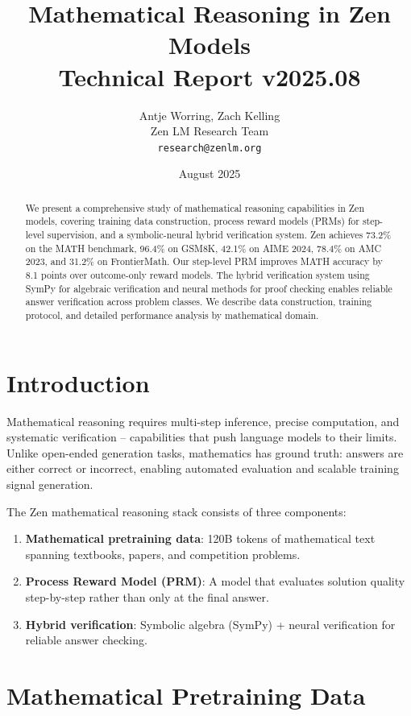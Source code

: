 \documentclass[11pt,a4paper]{article}
\title{\textbf{Mathematical Reasoning in Zen Models}\\
\large Technical Report v2025.08}
\author{Antje Worring, Zach Kelling \\ Zen LM Research Team\\
\texttt{research@zenlm.org}}
\date{August 2025}
\begin{document}
\maketitle

\begin{abstract}
We present a comprehensive study of mathematical reasoning capabilities in Zen models,
covering training data construction, process reward models (PRMs) for step-level
supervision, and a symbolic-neural hybrid verification system. Zen achieves 73.2\%
on the MATH benchmark, 96.4\% on GSM8K, 42.1\% on AIME 2024, 78.4\% on AMC 2023,
and 31.2\% on FrontierMath. Our step-level PRM improves MATH accuracy by 8.1 points
over outcome-only reward models. The hybrid verification system using SymPy for
algebraic verification and neural methods for proof checking enables reliable
answer verification across problem classes. We describe data construction, training
protocol, and detailed performance analysis by mathematical domain.
\end{abstract}

\section{Introduction}

Mathematical reasoning requires multi-step inference, precise computation, and
systematic verification -- capabilities that push language models to their limits.
Unlike open-ended generation tasks, mathematics has ground truth: answers are
either correct or incorrect, enabling automated evaluation and scalable training
signal generation.

The Zen mathematical reasoning stack consists of three components:
\begin{enumerate}
  \item \textbf{Mathematical pretraining data}: 120B tokens of mathematical text
    spanning textbooks, papers, and competition problems.
  \item \textbf{Process Reward Model (PRM)}: A model that evaluates solution quality
    step-by-step rather than only at the final answer.
  \item \textbf{Hybrid verification}: Symbolic algebra (SymPy) + neural verification
    for reliable answer checking.
\end{enumerate}

\section{Mathematical Pretraining Data}
\end{document}
